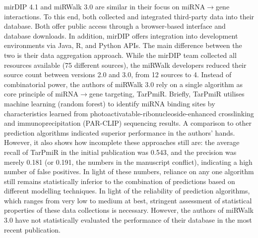 mirDIP 4.1\cite{Tokar2018} and miRWalk 3.0\cite{Sticht2018} are similar in their focus on miRNA$\to$gene interactions. To this end, both collected and integrated third-party data into their database. Both offer public access through a browser-based interface and database downloads. In addition, mirDIP offers integration into development environments via Java, R, and Python APIs. The main difference between the two is their data aggregation approach. While the mirDIP team collected all resources available (75 different sources\cite{Tokar2018}), the miRWalk developers reduced their source count between versions 2.0 and 3.0, from 12 sources to 4.\cite{Sticht2018} Instead of combinatorial power, the authors of miRWalk 3.0 rely on a single algorithm as core principle of miRNA$\to$gene targeting, TarPmiR.\cite{Ding2016} Briefly, TarPmiR utilises machine learning (random forest) to identify miRNA binding sites by characteristics learned from photoactivatable-ribonucleoside-enhanced crosslinking and immunoprecipitation (PAR-CLIP) sequencing results. A comparison to other prediction algorithms indicated superior performance in the authors' hands.\cite{Ding2016} However, it also shows how incomplete these approaches still are: the average recall of TarPmiR in the initial publication was 0.543, and the precision was merely 0.181 (or 0.191, the numbers in the manuscript conflict), indicating a high number of false positives. In light of these numbers, reliance on any one algorithm still remains statistically inferior to the combination of predictions based on different modelling techniques.\cite{Witkos2011} In light of the reliability of prediction algorithms, which ranges from very low to medium at best, stringent assessment of statistical properties of these data collections is necessary. 
However, the authors of miRWalk 3.0 have not statistically evaluated the performance of their database in the most recent publication.\cite{Sticht2018}

